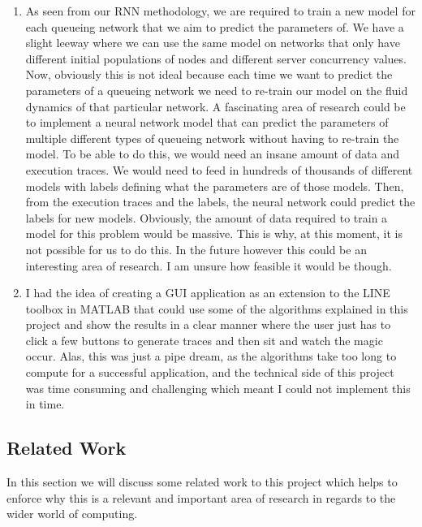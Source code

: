 \documentclass[a4paper,11pt,titlepage]{article}
\begin{document}
\begin{enumerate}
    \item As seen from our RNN methodology, we are required to train a new model for each queueing network that we aim to predict the parameters of. We have a slight leeway where we can use the same model on networks that only have different initial populations of nodes and different server concurrency values. Now, obviously this is not ideal because each time we want to predict the parameters of a queueing network we need to re-train our model on the fluid dynamics of that particular network. A fascinating area of research could be to implement a neural network model that can predict the parameters of multiple different types of queueing network without having to re-train the model. To be able to do this, we would need an insane amount of data and execution traces. We would need to feed in hundreds of thousands of different models with labels defining what the parameters are of those models. Then, from the execution traces and the labels, the neural network could predict the labels for new models. Obviously, the amount of data required to train a model for this problem would be massive. This is why, at this moment, it is not possible for us to do this. In the future however this could be an interesting area of research. I am unsure how feasible it would be though. 
    \item I had the idea of creating a GUI application as an extension to the LINE toolbox in MATLAB that could use some of the algorithms explained in this project and show the results in a clear manner where the user just has to click a few buttons to generate traces and then sit and watch the magic occur. Alas, this was just a pipe dream, as the algorithms take too long to compute for a successful application, and the technical side of this project was time consuming and challenging which meant I could not implement this in time. 
\end{enumerate}

\subsection{Related Work}

In this section we will discuss some related work to this project which helps to enforce why this is a relevant and important area of research in regards to the wider world of computing. 

\end{document}
